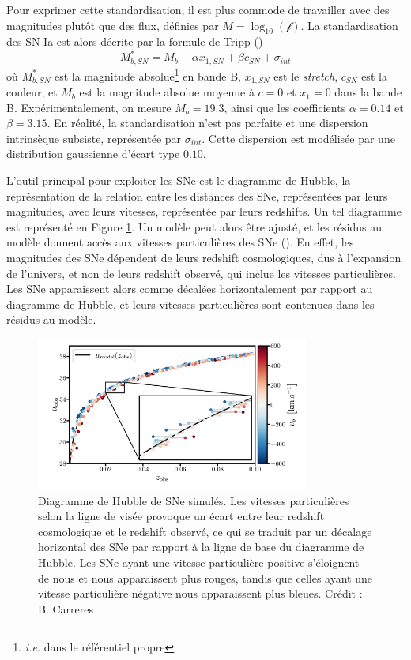 \documentclass{book}
\let\mcl\mathcal
\begin{document}
Pour exprimer cette standardisation, il est plus commode de travailler avec des magnitudes plutôt que des flux, définies par $M=\log_{10}(\mcl f)$. La standardisation des SN Ia est alors décrite par la formule de Tripp (\cite{tripp_two-parameter_1998})
\begin{equation}
\label{eq:tripp}
    M^*_{b,SN} = M_b - \alpha x_{1,SN} + \beta c_{SN} + \sigma_{int}
\end{equation}
où $M^*_{b,SN}$ est la magnitude absolue\footnote{\textit{i.e.} dans le référentiel propre} en bande B, $x_{1,SN}$ est le \textit{stretch}, $c_{SN}$ est la couleur, et $M_b$ est la magnitude absolue moyenne à $c=0$ et $x_1=0$ dans la bande B. Expérimentalement, on mesure $M_b=19.3$, ainsi que les coefficients $\alpha=0.14$ et $\beta=3.15$. En réalité, la standardisation n'est pas parfaite et une dispersion intrinsèque subsiste, représentée par $\sigma_{int}$. Cette dispersion est modélisée par une distribution gaussienne d'écart type $0.10$.

L'outil principal pour exploiter les SNe est le diagramme de Hubble, la représentation de la relation entre les distances des SNe, représentées par leurs magnitudes, avec leurs vitesses, représentée par leurs redshifts. Un tel diagramme est représenté en Figure \ref{fig:residues}. Un modèle peut alors être ajusté, et les résidus au modèle donnent accès aux vitesses particulières des SNe (\cite{davis_effect_2011}). En effet, les magnitudes des SNe dépendent de leurs redshift cosmologiques, dus à l'expansion de l'univers, et non de leurs redshift observé, qui inclue les vitesses particulières. Les SNe apparaissent alors comme décalées horizontalement par rapport au diagramme de Hubble, et leurs vitesses particulières sont contenues dans les résidus au modèle.

\begin{figure}
    \centering
    \includegraphics[width=0.8\textwidth]{figures/Residues.png}
    \caption{Diagramme de Hubble de SNe simulés. Les vitesses particulières selon la ligne de visée provoque un écart entre leur redshift cosmologique et le redshift observé, ce qui se traduit par un décalage horizontal des SNe par rapport à la ligne de base du diagramme de Hubble. Les SNe ayant une vitesse particulière positive s'éloignent de nous et nous apparaissent plus rouges, tandis que celles ayant une vitesse particulière négative nous apparaissent plus bleues. Crédit : B. Carreres}
    \label{fig:residues}
\end{figure}
\end{document}
